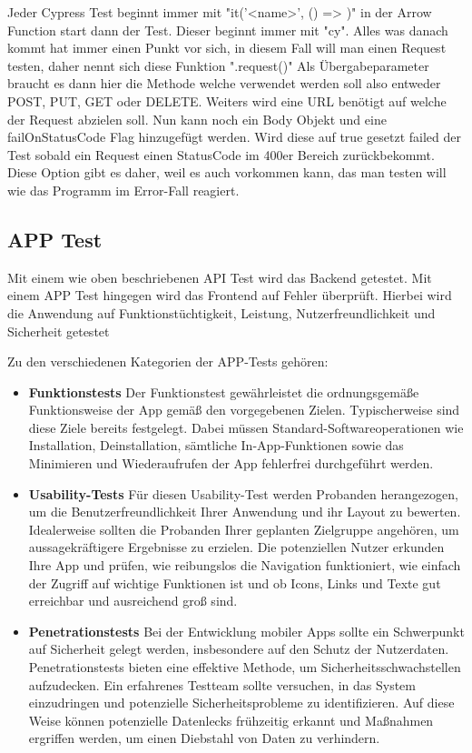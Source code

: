 Jeder Cypress Test beginnt immer mit "it('<name>', () => {})" in der Arrow Function start dann der Test. Dieser beginnt immer mit "cy". Alles was danach kommt hat immer einen Punkt vor sich, in diesem Fall will man einen Request testen, daher nennt sich diese Funktion ".request({})" Als Übergabeparameter braucht es dann hier die Methode welche verwendet werden soll also entweder POST, PUT, GET oder DELETE. Weiters wird eine URL benötigt auf welche der Request abzielen soll. Nun kann noch ein Body Objekt und eine failOnStatusCode Flag hinzugefügt werden. Wird diese auf true gesetzt failed der Test sobald ein Request einen StatusCode im 400er Bereich zurückbekommt. Diese Option gibt es daher, weil es auch vorkommen kann, das man testen will wie das Programm im Error-Fall reagiert.
\cite{API_Tests}
\subsection{APP Test}
Mit einem wie oben beschriebenen API Test wird das Backend getestet. Mit einem APP Test hingegen wird das Frontend auf Fehler überprüft. Hierbei wird die Anwendung auf Funktionstüchtigkeit, Leistung, Nutzerfreundlichkeit und Sicherheit getestet

Zu den verschiedenen Kategorien der APP-Tests gehören:

\begin{itemize}
    \item \textbf{Funktionstests}
        \newline
        Der Funktionstest gewährleistet die ordnungsgemäße Funktionsweise der App gemäß den vorgegebenen Zielen. Typischerweise sind diese Ziele bereits festgelegt. Dabei müssen Standard-Softwareoperationen wie Installation, Deinstallation, sämtliche In-App-Funktionen sowie das Minimieren und Wiederaufrufen der App fehlerfrei durchgeführt werden.
    \item \textbf{Usability-Tests}
        \newline
        Für diesen Usability-Test werden Probanden herangezogen, um die Benutzerfreundlichkeit Ihrer Anwendung und ihr Layout zu bewerten. Idealerweise sollten die Probanden Ihrer geplanten Zielgruppe angehören, um aussagekräftigere Ergebnisse zu erzielen. Die potenziellen Nutzer erkunden Ihre App und prüfen, wie reibungslos die Navigation funktioniert, wie einfach der Zugriff auf wichtige Funktionen ist und ob Icons, Links und Texte gut erreichbar und ausreichend groß sind.
    \item \textbf{Penetrationstests}
        \newline
        Bei der Entwicklung mobiler Apps sollte ein Schwerpunkt auf Sicherheit gelegt werden, insbesondere auf den Schutz der Nutzerdaten. Penetrationstests bieten eine effektive Methode, um Sicherheitsschwachstellen aufzudecken. Ein erfahrenes Testteam sollte versuchen, in das System einzudringen und potenzielle Sicherheitsprobleme zu identifizieren. Auf diese Weise können potenzielle Datenlecks frühzeitig erkannt und Maßnahmen ergriffen werden, um einen Diebstahl von Daten zu verhindern.
\end{itemize}



